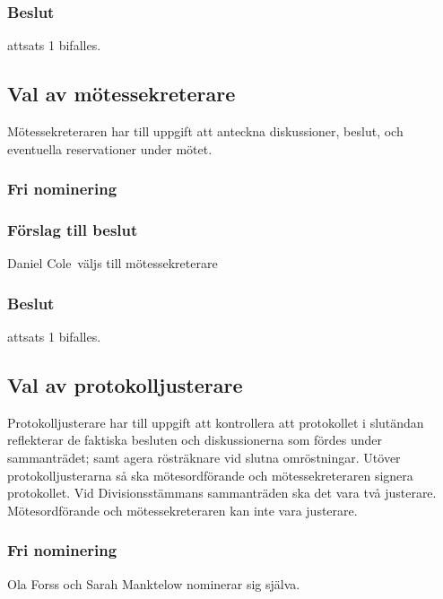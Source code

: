 \documentclass[protokoll]{dvd}
\def\ordf{Daniel Cole}
\begin{document}
\subsubsection*{Beslut}
\begin{attsatser}
    \item attsats 1 bifalles.
\end{attsatser}

\subsection{Val av mötessekreterare}

Mötessekreteraren har till uppgift att anteckna diskussioner, beslut, och eventuella reservationer under mötet.

\subsubsection*{Fri nominering}


\subsubsection*{Förslag till beslut}
\begin{attsatser}
    \item \ordf\ väljs till mötessekreterare
\end{attsatser}

\subsubsection*{Beslut}
\begin{attsatser}
    \item attsats 1 bifalles.
\end{attsatser}

\subsection{Val av protokolljusterare}

Protokolljusterare har till uppgift att kontrollera att protokollet i slutändan reflekterar de faktiska besluten och diskussionerna som fördes under sammanträdet; samt agera rösträknare vid slutna omröstningar.
Utöver protokolljusterarna så ska mötesordförande och mötessekreteraren signera protokollet.
Vid Divisionsstämmans sammanträden ska det vara två justerare.\\
Mötesordförande och mötessekreteraren kan inte vara justerare.
\subsubsection*{Fri nominering}
Ola Forss och Sarah Manktelow nominerar sig själva. 
\end{document}
